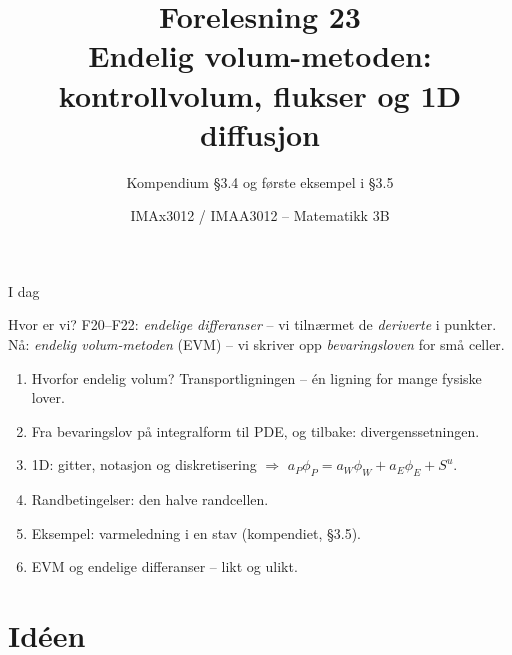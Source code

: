 \documentclass[11pt,aspectratio=169]{beamer}
\title[F23 -- Endelig volum i 1D]{Forelesning 23\\ Endelig volum-metoden: kontrollvolum, flukser og 1D diffusjon}
\subtitle{Kompendium §3.4 og første eksempel i §3.5}
\author{IMAx3012 / IMAA3012 -- Matematikk 3B}
\date{}
\begin{document}
\begin{frame}
\titlepage
\end{frame}

\begin{frame}{I dag}
\begin{remb}{Hvor er vi?}
F20--F22: \emph{endelige differanser} -- vi tilnærmet de \emph{deriverte} i punkter. Nå: \emph{endelig volum-metoden} (EVM) -- vi skriver opp \emph{bevaringsloven} for små celler.
\end{remb}
\begin{enumerate}
\item Hvorfor endelig volum? Transportligningen -- én ligning for mange fysiske lover.
\item Fra bevaringslov på integralform til PDE, og tilbake: divergenssetningen.
\item 1D: gitter, notasjon og diskretisering $\Rightarrow$ $a_P\phi_P = a_W\phi_W + a_E\phi_E + S^u$.
\item Randbetingelser: den halve randcellen.
\item Eksempel: varmeledning i en stav (kompendiet, §3.5).
\item EVM og endelige differanser -- likt og ulikt.
\end{enumerate}
\end{frame}

\section{Idéen}
\end{document}

